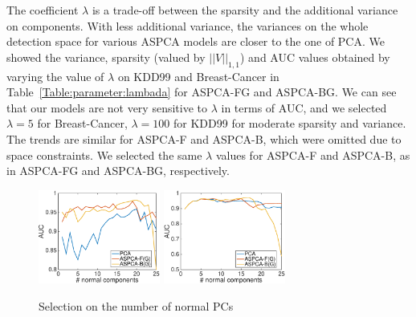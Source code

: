 The coefficient $\lambda$ is a trade-off between the sparsity and the additional variance on components. With less additional variance, the variances on the whole detection space for various ASPCA models are closer to the one of PCA. We showed the variance, sparsity (valued by $||V||_{1,1}$) and AUC values obtained by varying the value of $\lambda$ on KDD99 and Breast-Cancer in Table~\ref{Table:parameter:lambada} for ASPCA-FG and ASPCA-BG. We can see that our models are not very sensitive to $\lambda$  in terms of AUC, and we selected $\lambda=5$ for Breast-Cancer, $\lambda=100$ for KDD99 for moderate sparsity and variance. The trends are similar for ASPCA-F and ASPCA-B, which were omitted due to space constraints. We selected the same $\lambda$ values for ASPCA-F and ASPCA-B, as in ASPCA-FG and ASPCA-BG, respectively.


\begin{figure}
\centering
{}
{
	\includegraphics[width=40mm]{figure/new/Cancer-AUC-Components}
}
{
	\includegraphics[width=40mm]{figure/new/KDD-AUC-Components}
}
\caption{Selection on the number of normal PCs}
\label{Figure:parameter:components}
\end{figure}


